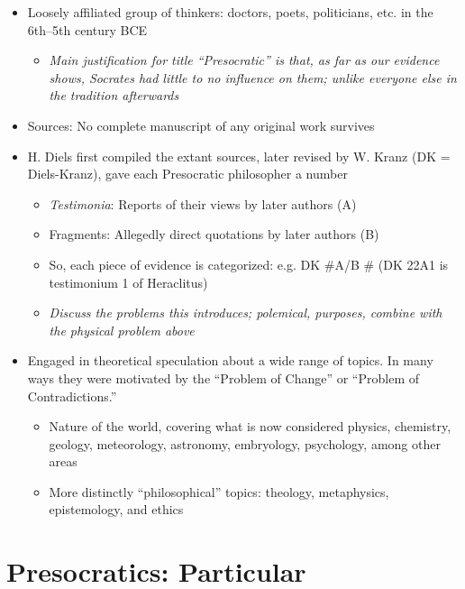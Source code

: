 \documentclass[11pt]{article}
\begin{document}
\begin{itemize}\item{Loosely affiliated group of thinkers: doctors, poets, politicians, etc. in the 6th--5th century BCE}\begin{itemize}\item{\emph{Main justification for title ``Presocratic'' is that, as far as our evidence shows, Socrates had little to no influence on them; unlike everyone else in the tradition afterwards}}\end{itemize}

\item{Sources: No complete manuscript of any original work survives}

\item{H. Diels first compiled the extant sources, later revised by W. Kranz (DK = Diels-Kranz), gave each Presocratic philosopher a number}

\begin{itemize}\item{\emph{Testimonia}: Reports of their views by later authors (A)}\item{Fragments: Allegedly direct quotations by later authors (B)}\item{So, each piece of evidence is categorized: e.g. DK \#A/B \# (DK 22A1 is testimonium 1 of Heraclitus)}\end{itemize}
\begin{itemize}\item{\emph{Discuss the problems this introduces; polemical, purposes, combine with the physical problem above}}\end{itemize}
\item{Engaged in theoretical speculation about a wide range of topics. In many ways they were motivated by the ``Problem of Change'' or ``Problem of Contradictions.''} \begin{itemize}\item{Nature of the world, covering what is now considered physics, chemistry, geology, meteorology, astronomy, embryology, psychology, among other areas}\item{More distinctly ``philosophical'' topics: theology, metaphysics, epistemology, and ethics}\end{itemize}

\end{itemize}

\section*{Presocratics: Particular}
\end{document}
